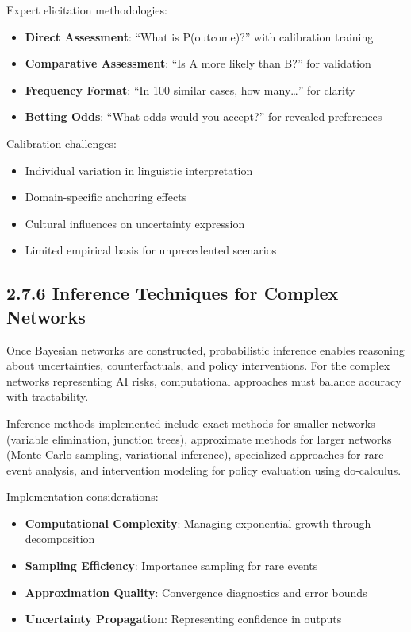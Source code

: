 \documentclass[
  11pt,
  letterpaper,
]{book}
\providecommand{\tightlist}{%
  \setlength{\itemsep}{0pt}\setlength{\parskip}{0pt}}
\begin{document}
Expert elicitation methodologies:

\begin{itemize}
\tightlist
\item
  \textbf{Direct Assessment}: ``What is P(outcome)?'' with calibration
  training
\item
  \textbf{Comparative Assessment}: ``Is A more likely than B?'' for
  validation
\item
  \textbf{Frequency Format}: ``In 100 similar cases, how many\ldots{}''
  for clarity
\item
  \textbf{Betting Odds}: ``What odds would you accept?'' for revealed
  preferences
\end{itemize}

Calibration challenges:

\begin{itemize}
\tightlist
\item
  Individual variation in linguistic interpretation
\item
  Domain-specific anchoring effects
\item
  Cultural influences on uncertainty expression
\item
  Limited empirical basis for unprecedented scenarios
\end{itemize}

\subsection*{2.7.6 Inference Techniques for Complex
Networks}\label{sec-inference-techniques}

Once Bayesian networks are constructed, probabilistic inference enables
reasoning about uncertainties, counterfactuals, and policy
interventions. For the complex networks representing AI risks,
computational approaches must balance accuracy with tractability.

Inference methods implemented include exact methods for smaller networks
(variable elimination, junction trees), approximate methods for larger
networks (Monte Carlo sampling, variational inference), specialized
approaches for rare event analysis, and intervention modeling for policy
evaluation using do-calculus.

Implementation considerations:

\begin{itemize}
\tightlist
\item
  \textbf{Computational Complexity}: Managing exponential growth through
  decomposition
\item
  \textbf{Sampling Efficiency}: Importance sampling for rare events
\item
  \textbf{Approximation Quality}: Convergence diagnostics and error
  bounds
\item
  \textbf{Uncertainty Propagation}: Representing confidence in outputs
\end{itemize}
\end{document}
